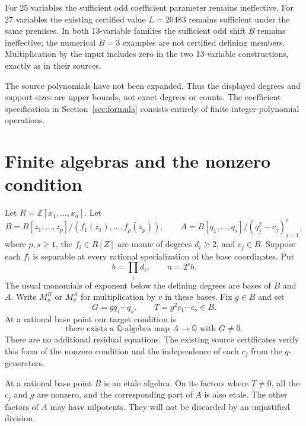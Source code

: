 \documentclass[11pt,a4paper]{article}
\newcommand{\Q}{\mathbb Q}\newcommand{\Z}{\mathbb Z}
\begin{document}
For 25 variables the sufficient odd coefficient parameter remains ineffective.
For 27 variables the existing certified value $L=20483$ remains sufficient
under the same premises. In both 13-variable families the sufficient odd
shift $B$ remains ineffective; the numerical $B=3$ examples are not
certified defining members. Multiplication by the input includes zero in
the two 13-variable constructions, exactly as in their sources.

The source polynomials have not been expanded. Thus the displayed degrees
and support sizes are upper bounds, not exact degrees or counts. The
coefficient specification in Section~\ref{sec:formula} consists entirely of
finite integer-polynomial operations.

\section{Finite algebras and the nonzero condition}
Let $R=\Z[x_1,\ldots,x_a]$. Let
\[
 B=R[z_1,\ldots,z_p]/(f_1(z_1),\ldots,f_p(z_p)),\qquad
 A=B[q_1,\ldots,q_s]/(q_j^2-c_j)_{j=1}^s,
\]
where $p,s\ge1$, the $f_i\in R[Z]$ are monic of degrees $d_i\ge2$,
and $c_j\in B$. Suppose each $f_i$ is separable at every rational
specialization of the base coordinates. Put
\[
 b=\prod_i d_i,\qquad n=2^s b.
\]
The usual monomials of exponent below the defining degrees are bases of
$B$ and $A$. Write $M_v^B$ or $M_v^A$ for multiplication by $v$ in these
bases. Fix $g\in B$ and set
\[
 G=gq_1\cdots q_s,\qquad T=g^2c_1\cdots c_s\in B.
\]
At a rational base point our target condition is
\begin{equation}\label{eq:target}
 \text{there exists a $\Q$-algebra map $A\longrightarrow\Q$ with $G\ne0$.}
\end{equation}
There are no additional residual equations. The existing source certificates
verify this form of the nonzero condition and the independence of each
$c_j$ from the $q$-generators.

At a rational base point $B$ is an etale algebra. On its factors where
$T\ne0$, all the $c_j$ and $g$ are nonzero, and the corresponding part of
$A$ is also etale. The other factors of $A$ may have nilpotents. They will
not be discarded by an unjustified division.
\end{document}
